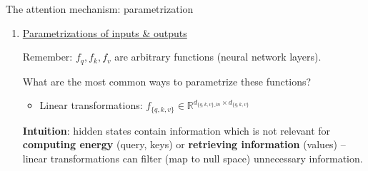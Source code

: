 \documentclass[12pt,aspectratio=169,handout]{beamer}
\newcounter{saveenumi}
\newcommand{\seti}{\setcounter{saveenumi}{\value{enumi}}}
\newcommand{\conti}{\setcounter{enumi}{\value{saveenumi}}}
\begin{document}
\begin{frame}{The attention mechanism: parametrization}
	\begin{enumerate}
		\conti
		\item \underline{Parametrizations of inputs \& outputs}

		Remember: $f_q, f_k, f_v$ are arbitrary functions (neural network layers).
		\pause
		
		\hspace{1em} What are the most common ways to parametrize these functions?

		\pause
		\begin{itemize}
			\item Linear transformations: $f_{\{q,k,v\}} \in \mathbb{R}^{d_{\{q,k,v\}\_in} \times d_{\{q,k,v\}}}$
		\end{itemize}
		\pause
		\vspace{1em}

		\textbf{Intuition}: hidden states contain information which is not relevant for \textbf{computing energy} (query, keys) or \textbf{retrieving information} (values) -- linear transformations can filter (map to null space) unnecessary information.
		\seti
	\end{enumerate}

\end{frame}
\end{document}
